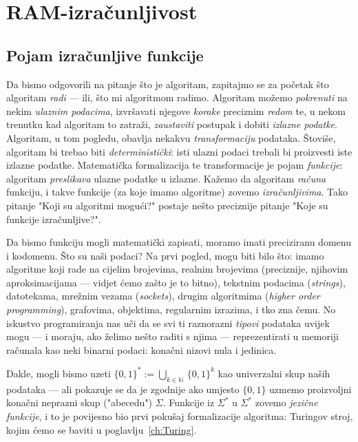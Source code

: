 \chapter{RAM-izračunljivost}

\section{Pojam izračunljive funkcije}

Da bismo odgovorili na pitanje što je algoritam, zapitajmo se za početak što algoritam \emph{radi}  --- ili, što mi algoritmom radimo. Algoritam možemo \emph{pokrenuti} na nekim \emph{ulaznim podacima}, izvršavati njegove \emph{korake} preciznim \emph{redom} te, u nekom trenutku kad algoritam to zatraži, \emph{zaustaviti} postupak i dobiti \emph{izlazne podatke}. Algoritam, u tom pogledu, obavlja nekakvu \emph{transformaciju} podataka. Štoviše, algoritam bi trebao biti \emph{deterministički}: isti ulazni podaci trebali bi proizvesti iste izlazne podatke. Matematička formalizacija te transformacije je pojam \emph{funkcije}: algoritam \emph{preslikava} ulazne podatke u izlazne. Kažemo da algoritam \emph{računa} funkciju, i takve funkcije (za koje imamo algoritme) zovemo \emph{izračunljivima}. Tako pitanje "Koji su algoritmi mogući?" postaje nešto preciznije pitanje "Koje su funkcije izračunljive?".


Da bismo funkciju mogli matematički zapisati, moramo imati preciziranu domenu i kodomenu. Što su naši podaci?
Na prvi pogled, mogu biti bilo što: imamo algoritme koji rade na cijelim brojevima, realnim brojevima (preciznije, njihovim aproksimacijama --- vidjet ćemo zašto je to bitno), tekstnim podacima (\emph{strings}), datotekama, mrežnim vezama (\emph{sockets}), drugim algoritmima (\emph{higher order programming}), grafovima, objektima, regularnim izrazima, i tko zna čemu. No iskustvo programiranja nas uči da se svi ti raznorazni \emph{tipovi} podataka uvijek mogu --- i moraju, ako želimo nešto raditi s njima --- reprezentirati u memoriji računala kao neki binarni podaci: konačni nizovi nula i jedinica.

Dakle, mogli bismo uzeti $\{0,1\}^*:=\bigcup_{k\in\mathbb N}\,\{0,1\}^k$ kao univerzalni skup naših podataka --- ali pokazuje se da je zgodnije ako umjesto $\{0,1\}$ uzmemo proizvoljni konačni neprazni skup ("abecedu") $\Sigma$. Funkcije iz $\Sigma^*$ u $\Sigma^*$ zovemo \emph{jezične funkcije}, i to je povijesno bio prvi pokušaj formalizacije algoritma: Turingov stroj, kojim ćemo se baviti u poglavlju~\ref{ch:Turing}.

